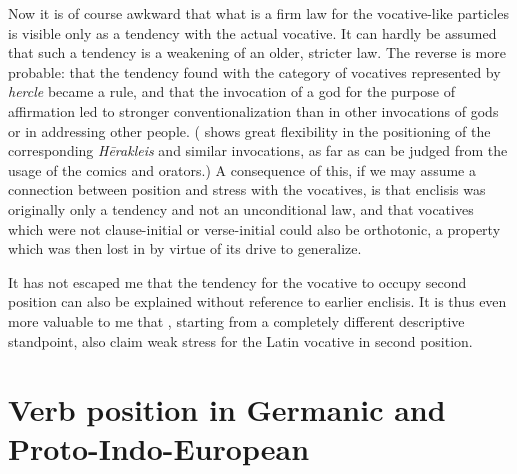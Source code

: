 Now it is of course awkward that what is a firm law for the vocative-like particles is visible only as a tendency with the actual vocative. It can hardly be assumed that such a tendency is a weakening of an older, stricter law. The reverse is more probable: that the tendency found with the category of vocatives represented by \emph{hercle} became a rule, and that the invocation of a god for the purpose of affirmation led to stronger conventionalization than in other invocations of gods or in addressing other people. ( shows great flexibility in the positioning of the corresponding \emph{Hērakleis} and similar invocations, as far as can be judged from the usage of the comics and orators.) A consequence of this, if we may assume a connection between position and stress with the vocatives, is that  enclisis was originally only a tendency and not an unconditional law, and that vocatives which were not clause-initial or verse-initial could also be orthotonic, a property which was then lost in  by virtue of its drive to generalize.

It has not escaped me that the tendency for the vocative to occupy second position can also be explained without reference to earlier enclisis. It is thus even more valuable to me that \citet[557]{StolzSchmalz1890}, starting from a completely different descriptive standpoint, also claim weak stress for the Latin vocative in second position.


\section{Verb position in Germanic and Proto-Indo-European}

